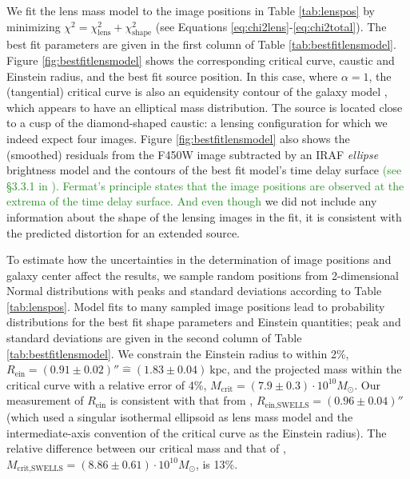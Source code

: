 \documentclass[useAMS,usenatbib]{mnras}
\newcommand{\NEW}[1]{\textcolor{ForestGreen}{#1}}
\newcommand{\OLD}[1]{}
\begin{document}
We fit the lens mass model to the image positions in Table \ref{tab:lenspos} by minimizing $\chi^2 = \chi_\text{lens}^2 + \chi_\text{shape}^2$ (see Equations \eqref{eq:chi2lens}-\eqref{eq:chi2total}). The best fit parameters are given in the first column of Table \ref{tab:bestfitlensmodel}. Figure \ref{fig:bestfitlensmodel} shows the corresponding critical curve, caustic and Einstein radius, and the best fit source position. In this case, where $\alpha=1$, the (tangential) critical curve is also an equidensity contour of the galaxy model \citep{EvansWitt}, which appears to have an elliptical mass distribution. The source is located close to a cusp of the diamond-shaped caustic: a lensing configuration for which we indeed expect four images. Figure \ref{fig:bestfitlensmodel} also shows the (smoothed) residuals from the F450W image subtracted by an IRAF \emph{ellipse} brightness model and the contours of the best fit model's time delay surface \NEW{(see \S 3.3.1 in \citet{1996astro.ph..6001N}).  Fermat's principle states that the image positions are observed at the extrema of the time delay surface. And even though}\OLD{. This demonstrates that, although} we did not include any information about the shape of the lensing images in the fit, it is consistent with the predicted distortion for an extended source.

To estimate how the uncertainties in the determination of image positions and galaxy center affect the results, we sample random positions from 2-dimensional Normal distributions with peaks and standard deviations according to Table \ref{tab:lenspos}. Model fits to many sampled image positions lead to probability distributions for the best fit shape parameters and Einstein quantities; peak and standard deviations are given in the second column of Table \ref{tab:bestfitlensmodel}. We constrain the Einstein radius to within 2\%, $R_\text{ein} = (0.91 \pm 0.02)'' \hat{=}(1.83\pm0.04)~\text{kpc}$, and the projected mass within the critical curve with a relative error of 4\%, $M_\text{crit} =(7.9\pm0.3)\cdot 10^{10} M_\odot$. Our measurement of $R_\text{ein}$ is consistent with that from \citet{SWELLSIII}, $R_\text{ein,SWELLS} = (0.96 \pm 0.04)''$ (which used a singular isothermal ellipsoid as lens mass model and the intermediate-axis convention of the critical curve as the Einstein radius). The relative difference between our critical mass and that of \citet{SWELLSIII}, $M_\text{crit,SWELLS} =(8.86\pm0.61)\cdot 10^{10} M_\odot$, is 13\%.
\end{document}
